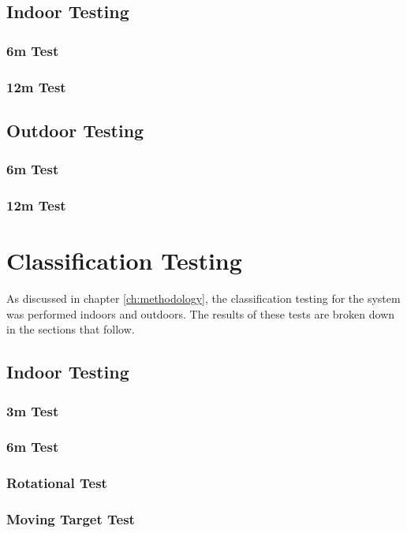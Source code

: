 \documentclass[11pt]{report}
\begin{document}
\subsection{Indoor Testing}
\subsubsection{6m Test}
\subsubsection{12m Test}


\subsection{Outdoor Testing}
\subsubsection{6m Test}
\subsubsection{12m Test}



\section{Classification Testing}
As discussed in chapter \ref{ch:methodology}, the classification testing for the system was performed indoors and outdoors. The results of these tests are broken down in the sections that follow.
\subsection{Indoor Testing}
\subsubsection{3m Test}
\subsubsection{6m Test}
\subsubsection{Rotational Test}
\subsubsection{Moving Target Test}
\end{document}

